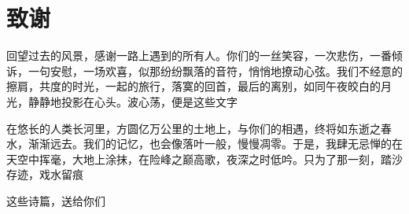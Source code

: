 \chapter{致谢}

回望过去的风景，感谢一路上遇到的所有人。你们的一丝笑容，一次悲伤，一番倾诉，一句安慰，一场欢喜，似那纷纷飘落的音符，悄悄地撩动心弦。我们不经意的擦肩，共度的时光，一起的旅行，落寞的回首，最后的离别，如同午夜皎白的月光，静静地投影在心头。波心荡，便是这些文字

在悠长的人类长河里，方圆亿万公里的土地上，与你们的相遇，终将如东逝之春水，渐渐远去。我们的记忆，也会像落叶一般，慢慢凋零。于是，我肆无忌惮的在天空中挥毫，大地上涂抹，在险峰之巅高歌，夜深之时低吟。只为了那一刻，踏沙存迹，戏水留痕

这些诗篇，送给你们 
